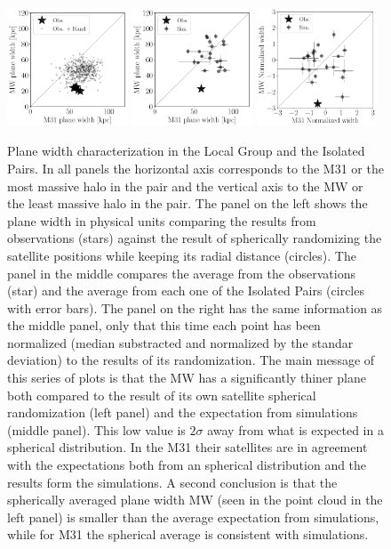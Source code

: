 \documentclass[a4paper,fleqn,usenatbib]{mnras}
\begin{document}
\begin{figure}
\centering
\includegraphics[width=0.32\textwidth]{scatter_random_ranked_width.pdf}
\includegraphics[width=0.32\textwidth]{scatter_ranked_width.pdf}
\includegraphics[width=0.32\textwidth]{scatter_norm_ranked_width.pdf}
\caption{Plane width characterization in the Local Group and the
  Isolated Pairs. In all panels the horizontal axis corresponds to the
  M31 or the most massive halo in the pair and the vertical axis to
  the MW or the least massive halo in the pair.
The panel on the left shows the plane width in physical units
comparing the results from observations
(stars) against the result of spherically randomizing the satellite
positions while keeping its radial distance (circles). 
The panel in the middle compares the average from the observations
(star) and the average from each one of the Isolated Pairs (circles
with error bars).
The panel on the right has the same information as the middle panel,
only that this time each point has been normalized (median substracted
and normalized by the standar deviation) to the results of its
randomization. 
The main message of this series of plots is that the MW has a
significantly thiner plane both compared to the result of its own
satellite spherical randomization (left panel) and the expectation from
simulations (middle panel). 
This low value is $2\sigma$ away from what is expected in a spherical
distribution. 
In the M31 their satellites are in agreement with the expectations
both from an spherical distribution and the results form the
simulations. 
A second conclusion is that the spherically averaged plane width
MW (seen in the point cloud in the left panel) is smaller than the
average expectation from simulations, while for M31 the spherical
average is consistent with simulations. 
\label{fig:scatter_width}}
\end{figure}
\end{document}
